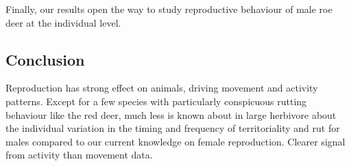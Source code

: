 \documentclass[a4paper,11pt]{article}
\begin{document}
Finally, our results open the way to study reproductive behaviour of male roe deer at the individual level.

\subsection*{Conclusion}
Reproduction has strong effect on animals, driving movement and
activity patterns. Except for a few species with particularly
conspicuous rutting behaviour like the red deer, much less is known
about in large herbivore about the individual variation in the timing
and frequency of territoriality and rut for males compared to our
current knowledge on female reproduction. Clearer signal from activity
than movement data.




\end{document}
